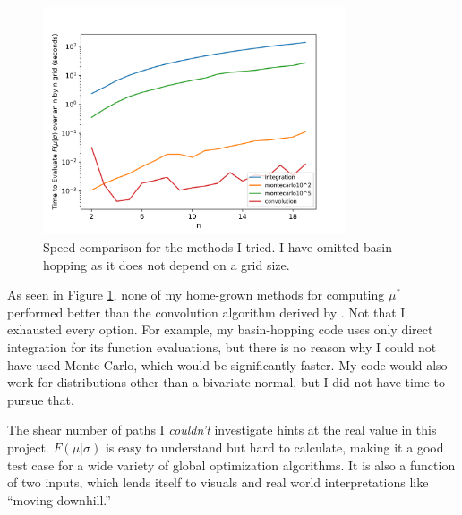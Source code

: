 \documentclass[]{article}
\begin{document}
\begin{figure}[h]
	\centering
	\includegraphics[width=0.8\textwidth]{../images/timing.png}
	\caption{Speed comparison for the methods I tried. I have omitted basin-hopping as it does not depend on a grid size.}
	\label{fig:time}
\end{figure}

As seen in Figure \ref{fig:time}, none of my home-grown methods for computing $\mu^*$ performed better than the convolution algorithm derived by \citeauthor{stat}.  Not that I exhausted every option. For example, my basin-hopping code uses only direct integration for its function evaluations, but there is no reason why I could not have used Monte-Carlo, which would be significantly faster. My code would also work for distributions other than a bivariate normal, but I did not have time to pursue that.

The shear number of paths I \emph{couldn't} investigate hints at the real value in this project. $F(\mu \vert \sigma)$ is easy to understand but hard to calculate, making it a good test case for a wide variety of global optimization algorithms. It is also a function of two inputs, which lends itself to visuals and real world interpretations like ``moving downhill.'' 







\printbibliography
\end{document}
